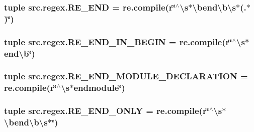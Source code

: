 \hypertarget{namespacesrc_1_1regex_a94eadab581e7c5c775eb7143ae94d7e3}{
\subsubsection[{R\-E\-\_\-\-E\-N\-D}]{\setlength{\rightskip}{0pt plus 5cm}tuple src.\-regex.\-R\-E\-\_\-\-E\-N\-D = re.\-compile(r\char`\"{}$^\wedge$\textbackslash{}s$\ast$\textbackslash{}bend\textbackslash{}b\textbackslash{}s$\ast$(.$\ast$)\char`\"{})}}\label{namespacesrc_1_1regex_a94eadab581e7c5c775eb7143ae94d7e3}
\hypertarget{namespacesrc_1_1regex_a31367bbe6cd72c1fa18841c3ebec75da}{
\subsubsection[{R\-E\-\_\-\-E\-N\-D\-\_\-\-I\-N\-\_\-\-B\-E\-G\-I\-N}]{\setlength{\rightskip}{0pt plus 5cm}tuple src.\-regex.\-R\-E\-\_\-\-E\-N\-D\-\_\-\-I\-N\-\_\-\-B\-E\-G\-I\-N = re.\-compile(r\char`\"{}$^\wedge$\textbackslash{}s$\ast$end\textbackslash{}b\char`\"{})}}\label{namespacesrc_1_1regex_a31367bbe6cd72c1fa18841c3ebec75da}
\hypertarget{namespacesrc_1_1regex_a3ee298d64558fe0d75b353a888087afa}{
\subsubsection[{R\-E\-\_\-\-E\-N\-D\-\_\-\-M\-O\-D\-U\-L\-E\-\_\-\-D\-E\-C\-L\-A\-R\-A\-T\-I\-O\-N}]{\setlength{\rightskip}{0pt plus 5cm}tuple src.\-regex.\-R\-E\-\_\-\-E\-N\-D\-\_\-\-M\-O\-D\-U\-L\-E\-\_\-\-D\-E\-C\-L\-A\-R\-A\-T\-I\-O\-N = re.\-compile(r\char`\"{}$^\wedge$\textbackslash{}s$\ast$endmodule\char`\"{})}}\label{namespacesrc_1_1regex_a3ee298d64558fe0d75b353a888087afa}
\hypertarget{namespacesrc_1_1regex_a282195cf68fc1f4d418133f31ea12fe7}{
\subsubsection[{R\-E\-\_\-\-E\-N\-D\-\_\-\-O\-N\-L\-Y}]{\setlength{\rightskip}{0pt plus 5cm}tuple src.\-regex.\-R\-E\-\_\-\-E\-N\-D\-\_\-\-O\-N\-L\-Y = re.\-compile(r\char`\"{}$^\wedge$\textbackslash{}s$\ast$\textbackslash{}bend\textbackslash{}b\textbackslash{}s$\ast$\char`\"{})}}\label{namespacesrc_1_1regex_a282195cf68fc1f4d418133f31ea12fe7}
